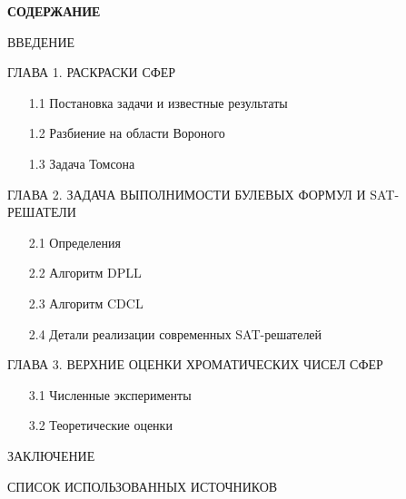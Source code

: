 
\newpage


\begin{center}
\textbf{СОДЕРЖАНИЕ}
\end{center}
\vspace{1.5mm}

\begin{description}

\item{ВВЕДЕНИЕ} \dotfill \pageref{chapters:introduction}

\item{ГЛАВА 1.} РАСКРАСКИ СФЕР \dotfill \pageref{chapters:1}
\begin{enumerate}
\item[1.1] Постановка задачи и известные результаты \dotfill \pageref{chapters:1.1}
\item[1.2] Разбиение на области Вороного \dotfill \pageref{chapters:1.2}
\item[1.3] Задача Томсона \dotfill \pageref{chapters:1.3}
\end{enumerate}

\item{ГЛАВА 2.} ЗАДАЧА ВЫПОЛНИМОСТИ БУЛЕВЫХ ФОРМУЛ И SAT-РЕШАТЕЛИ \dotfill \pageref{chapters:2}
\begin{enumerate}
\item[2.1] Определения \dotfill \pageref{chapters:2.1}
\item[2.2] Алгоритм DPLL \dotfill \pageref{chapters:2.2}
\item[2.3] Алгоритм CDCL \dotfill \pageref{chapters:2.3}
\item[2.4] Детали реализации современных SAT-решателей \dotfill \pageref{chapters:2.4}
\end{enumerate}

\item{ГЛАВА 3.} ВЕРХНИЕ ОЦЕНКИ ХРОМАТИЧЕСКИХ ЧИСЕЛ СФЕР \dotfill \pageref{chapters:3}
\begin{enumerate}
\item[3.1] Численные эксперименты \dotfill \pageref{chapters:3.1}
\item[3.2] Теоретические оценки \dotfill \pageref{chapters:3.2}
\end{enumerate}

\item{ЗАКЛЮЧЕНИЕ} \dotfill \pageref{chapters:conclusions}
\item{СПИСОК ИСПОЛЬЗОВАННЫХ ИСТОЧНИКОВ} \dotfill \pageref{chapters:biblio}


\end{description}
